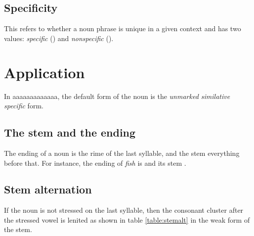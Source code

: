 \documentclass{book}
\newcommand{\lname}{aaaaaaaaaaaaa}
\begin{document}
\subsection{Specificity}

This refers to whether a noun phrase is unique in a given context and has two values: \emph{specific} () and \emph{nonspecific} ().

\section{Application}

In \lname{}, the default form of the noun is the \emph{unmarked similative specific} form.


\subsection{The stem and the ending}

The ending of a noun is the rime of the last syllable, and the stem everything before that. For instance, the ending of  \emph{fish} is  and its stem .

\subsection{Stem alternation}

If the noun is not stressed on the last syllable, then the consonant cluster after the stressed vowel is lenited as shown in table \ref{table:stemalt} in the weak form of the stem.
\end{document}

